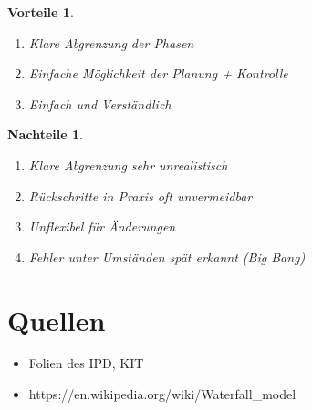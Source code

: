 \documentclass[a4paper]{article}
\theoremstyle{break}
\newtheorem{why}{Vorteile}[section]
\newtheorem{whynot}{Nachteile}[section]
\begin{document}
\begin {why}
  \begin {enumerate}
    \item Klare Abgrenzung der Phasen
    \item Einfache Möglichkeit der Planung + Kontrolle
      \item Einfach und Verständlich
  \end {enumerate}
  
\end {why}
\begin {whynot}
  \begin {enumerate}
  \item Klare Abgrenzung sehr unrealistisch
  \item Rückschritte in Praxis oft unvermeidbar
  \item Unflexibel für Änderungen
  \item Fehler unter Umständen spät erkannt (Big Bang)
  \end {enumerate}
\end {whynot}



\appendix
\section{Quellen}
\begin{itemize}
	\item Folien des IPD, KIT
	\item https://en.wikipedia.org/wiki/Waterfall\_model
\end{itemize}
\end{document}
